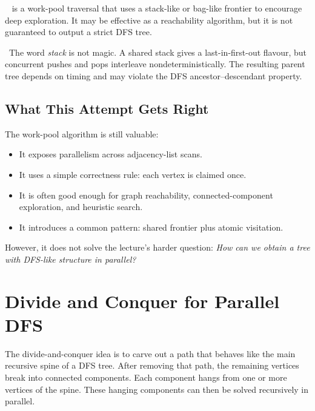 \begin{ppdefn}
\  is a work-pool traversal that uses a stack-like or bag-like frontier to encourage deep exploration.
It may be effective as a reachability algorithm, but it is not guaranteed to output a strict DFS tree.
\end{ppdefn}

\begin{pppitfall}
\ The word \emph{stack} is not magic.
A shared stack gives a last-in-first-out flavour, but concurrent pushes and pops interleave nondeterministically.
The resulting parent tree depends on timing and may violate the DFS ancestor--descendant property.
\end{pppitfall}

\subsection{What This Attempt Gets Right}

The work-pool algorithm is still valuable:

\begin{itemize}
    \item It exposes parallelism across adjacency-list scans.
    \item It uses a simple correctness rule: each vertex is claimed once.
    \item It is often good enough for graph reachability, connected-component exploration, and heuristic search.
    \item It introduces a common pattern: shared frontier plus atomic visitation.
\end{itemize}

However, it does not solve the lecture's harder question:
\emph{How can we obtain a tree with DFS-like structure in parallel?}

\section{Divide and Conquer for Parallel DFS}
\label{sec:parallel-dfs-dc}

The divide-and-conquer idea is to carve out a path that behaves like the main recursive spine of a DFS tree.
After removing that path, the remaining vertices break into connected components.
Each component hangs from one or more vertices of the spine.
These hanging components can then be solved recursively in parallel.

